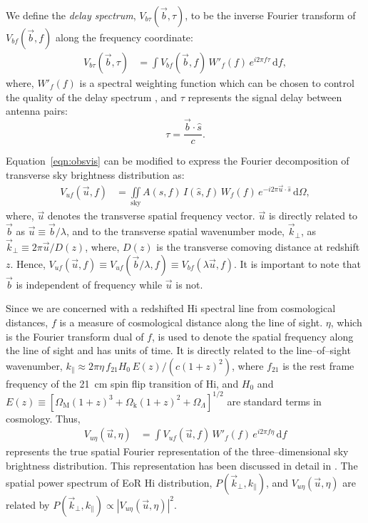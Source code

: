 \documentclass[preprint2,iop,numberedappendix]{emulateapj}
\newcommand{\dif}{\mathrm{d}}
\begin{document}
We define the {\it delay spectrum}, $V_{b\tau}(\vec{b},\tau)$, to be the inverse Fourier transform of $V_{bf}(\vec{b},f)$ along the frequency coordinate:
\begin{align}\label{eqn:delay-transform}
  V_{b\tau}(\vec{b},\tau) &= \int V_{bf}(\vec{b},f)\,W'_f(f)\,e^{i2\pi f\tau}\,\dif f,
\end{align}
where, $W'_f(f)$ is a spectral weighting function which can be chosen to control the quality of the delay spectrum \citep{thy13,ved12}, and $\tau$ represents the signal delay between antenna pairs:
\begin{equation}\label{eqn:delay}
  \tau = \frac{\vec{b}\cdot\hat{s}}{c}.
\end{equation}

Equation~\ref{eqn:obsvis} can be modified to express the Fourier decomposition of transverse sky brightness distribution as:
\begin{align}\label{eqn:vis}
  V_{uf}(\vec{u},f) &= \iint\limits_\textrm{sky} A(\hat{s},f)\,I(\hat{s},f)\,W_f(f)\,e^{-i2\pi\vec{u}\cdot\hat{s}}\,\dif\Omega,
\end{align}
where, $\vec{u}$ denotes the transverse spatial frequency vector. $\vec{u}$ is directly related to $\vec{b}$ as $\vec{u}\equiv \vec{b}/\lambda$, and to the transverse spatial wavenumber mode, $\vec{k}_\perp$, as $\vec{k}_\perp\equiv 2\pi\vec{u}/D(z)$, where, $D(z)$ is the transverse comoving distance at redshift $z$. Hence, $V_{uf}(\vec{u},f)\equiv V_{uf}(\vec{b}/\lambda,f)\equiv V_{bf}(\lambda\vec{u},f)$. It is important to note that $\vec{b}$ is independent of frequency while $\vec{u}$ is not.

Since we are concerned with a redshifted H{\sc i} spectral line from cosmological distances, $f$ is a measure of cosmological distance along the line of sight. $\eta$, which is the Fourier transform dual of $f$, is used to denote the spatial frequency along the line of sight and has units of time. It is directly related to the line--of--sight wavenumber, $k_\parallel\approx 2\pi\eta\,f_{21}H_0\,E(z)/(c(1+z)^2)$, where $f_{21}$ is the rest frame frequency of the 21~cm spin flip transition of H{\sc i}, and $H_0$ and $E(z)\equiv [\Omega_\textrm{M}(1+z)^3+\Omega_\textrm{k}(1+z)^2+\Omega_\Lambda]^{1/2}$ are standard terms in cosmology. Thus,
\begin{align}\label{eqn:los-transform}
  V_{u\eta}(\vec{u},\eta) &= \int V_{uf}(\vec{u},f)\,W'_f(f)\,e^{i2\pi f\eta}\,\dif f
\end{align}
represents the true spatial Fourier representation of the three--dimensional sky brightness distribution. This representation has been discussed in detail in \citet{mor04}. The spatial power spectrum of EoR H{\sc i} distribution, $P(\vec{k}_\perp,k_\parallel)$, and $V_{u\eta}(\vec{u},\eta)$ are related by $P(\vec{k}_\perp,k_\parallel)\propto |V_{u\eta}(\vec{u},\eta)|^2$. 
\end{document}
